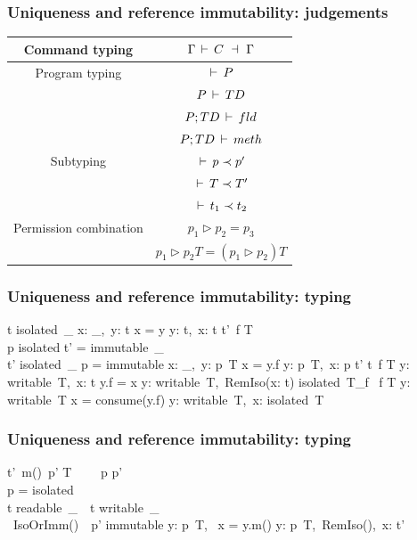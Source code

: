 \begin{frame}
    \frametitle{Uniqueness and reference immutability: judgements}
    \begin{center}
    \begin{tabular}{c | c}
    Command typing & $\Gamma \,\vdash\, C \ \dashv\  \Gamma$ \\
                   \hline

    Program typing & $\,\vdash\, P$          \\
                   & $P \,\vdash\, TD$       \\
                   & $P; TD \,\vdash\, fld$  \\
                   & $P; TD \,\vdash\, meth$ \\
                   \hline

    Subtyping & $\,\vdash\, p \prec p'$    \\
              & $\,\vdash\, T \prec T'$    \\
              & $\,\vdash\, t_1 \prec t_2$ \\
              \hline

    Permission combination & $p_1 \rhd p_2 = p_3$                \\
                           & $p_1 \rhd p_2 T = (p_1 \rhd p_2) T$ \\
    \end{tabular}
    \end{center}
\end{frame}

\begin{frame}
    \frametitle{Uniqueness and reference immutability: typing}
    \infrule
    {
        t \neq isolated\ \_
    }
    {
        x: \_,\ y: t \ts x = y \rts y: t,\ x: t
    }
    \infrule
    {
        t'\ f \in T \\
        p \neq isolated \vee t' = immutable\ \_ \\
        t' \neq isolated\ \_ \vee p = immutable
    }
    {
        x: \_,\ y: p\ T
        \ts x = y.f
        \rts y: p\ T,\ x: p \triangleright t'
    }
    \infrule
    {
        t\ f \in T
    }
    {
        y: writable\ T,\ x: t
        \ts y.f = x
        \rts y: writable\ T,\ RemIso(x: t)
    }
    \infrule
    {
        isolated\ T_f \ f \in T
    }
    {
        y: writable\ T
        \ts x = consume(y.f)
        \rts y: writable\ T,\ x: isolated\ T
    }
\end{frame}

\begin{frame}
    \frametitle{Uniqueness and reference immutability: typing}
    \infrule
    {
        t'\ m()\ p' \in T \ \ \ \
        \ts p \prec p' \ \ \ \
         \\
        p = isolated \Rightarrow \\
                 t \neq readable\ \_\
        \wedge\  t \neq writable\ \_\\
        \wedge\  IsoOrImm(\seq{z: t})\
        \wedge\  p' \neq immutable
    }
    {
        y: p\ T,\ \seq{z: u}
        \ts x = y.m(\seq{z})
        \rts y: p\ T,\ RemIso(),\ x: t'
    }
\end{frame}

